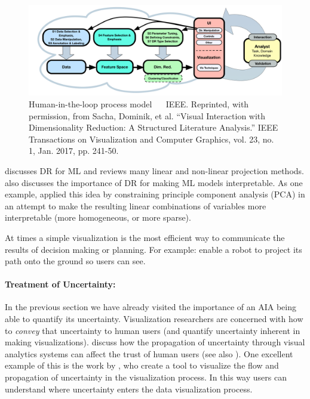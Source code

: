 \begin{figure}[htpb]
    \centering
    \includegraphics[width=0.7\linewidth]{Figures/dimred_framework.png}
    \caption{Human-in-the-loop process model ~\cite{Sacha2017-hf}~ IEEE. Reprinted, with permission, from Sacha, Dominik, et al. ``Visual Interaction with Dimensionality Reduction: A Structured Literature Analysis.'' IEEE Transactions on Visualization and Computer Graphics, vol. 23, no. 1, Jan. 2017, pp. 241-50.}
    \label{fig:sacha_fig}
    \vspace{-0.2 in}
\end{figure}

\citet{Venna2007-yj} discusses DR for ML and reviews many linear and non-linear projection methods. \citet{Vellido2012-nm} also discusses the importance of DR for making ML models interpretable. As one example, \citet{Chipman2005-om} applied this idea by constraining principle component analysis (PCA) in an attempt to make the resulting linear combinations of variables more interpretable (more homogeneous, or more sparse).

At times a simple visualization is the most efficient way to communicate the results of decision making or planning. For example: \citet{Chadalavada2015-wx} enable a robot to project its path onto the ground so users can see.

\paragraph{Treatment of Uncertainty:}
In the previous section we have already visited the importance of an AIA being able to quantify its uncertainty. Visualization researchers are concerned with how to \emph{convey} that uncertainty to human users (and quantify uncertainty inherent in making visualizations). \citet{Sacha2016-tu} discuss how the propagation of uncertainty through visual analytics systems can affect the trust of human users (see also \cite{Correa2009-hi}).
One excellent example of this is the work by \citet{Wu2012-qi}, who create a tool to visualize the flow and propagation of uncertainty in the visualization process. In this way users can understand where uncertainty enters the data visualization process.

